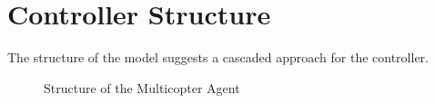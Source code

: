 \section{Controller Structure}
The structure of the model suggests a cascaded approach for the controller.

\begin{figure}[ht]
 \footnotesize
 
 \caption{Structure of the Multicopter Agent}
 \label{fig:StructureMulticopterAgent}
\end{figure}
